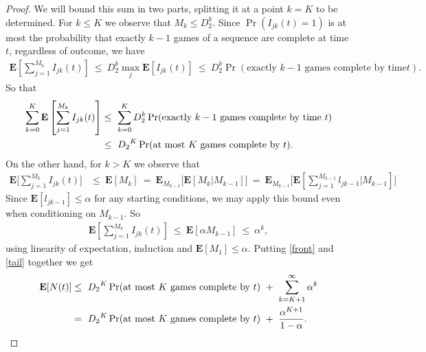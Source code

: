 \documentclass[11pt]{article}
\theoremstyle{definition}
\theoremstyle{remark}
\newcommand{\e}{\mathbf{E}}
\begin{document}
\begin{proof}
We will bound this sum in two parts, splitting it at a point $k=K$
to be determined. For $k\leq K$ we observe that $M_k\leq D_2^k$.
Since $\Pr (I_{jk}(t)=1)$ is at most the probability that exactly
$k-1$ games of a sequence are complete at time $t$, regardless of
outcome, we have
\begin{align*}
\e \left[ \sum_{j=1}^{M_k} I_{jk}(t)\right]\ \leq\ D_2^k \max_j
\e[I_{jk}(t)]\ \leq\ D_2^k \Pr(\textrm{exactly $k-1$ games complete by time
$t$}).
\end{align*}
So that
\begin{align}
\sum_{k=0}^K \e \left[ \sum_{j=1}^{M_k} I_{jk}(t)\right]&\leq\
\sum_{k=0}^K D_2^k \Pr(\textrm{exactly $k-1$ games complete by time $t$})\notag \\
&\leq\ {D_2}^K\Pr(\textrm{at most $K$ games complete by $t$}).\label{front}
\end{align}
On the other hand, for $k>K$ we observe that
\begin{align*}
\e \bigg[ \sum_{j=1}^{M_k} I_{jk}(t)\bigg]&\leq\ \e[M_k]\ =\
\e_{M_{k-1}}\big[\e[M_k|M_{k-1}]\big]\ =\
\e_{M_{k-1}}\big[\e[\sum_{j=1}^{M_{k-1}}l_{jk-1}|M_{k-1}]\big]
\end{align*}
Since $\e[l_{jk-1}]\leq\alpha$ for any starting conditions, we may
apply this bound even when conditioning on $M_{k-1}$. So
\begin{align}
\e \left[ \sum_{j=1}^{M_k} I_{jk}(t)\right]
\ \leq\ \e[\alpha M_{k-1}]\ \leq\ \alpha^k,\label{tail}
\end{align}
using linearity of expectation, induction and $\e[M_1]\leq\alpha$. Putting
\eqref{front} and \eqref{tail} together we get
\begin{align} \e[N(t)]&\leq\ {D_2}^K\Pr(\textrm{at most $K$ games complete by $t$})
\ +\ \sum_{k=K+1}^\infty \alpha^k\notag \\
&=\ {D_2}^K\Pr(\textrm{at most $K$ games complete by $t$}) \ +\
\frac{\alpha^{K+1}}{1-\alpha}.
\end{align}


\end{proof}
\end{document}
